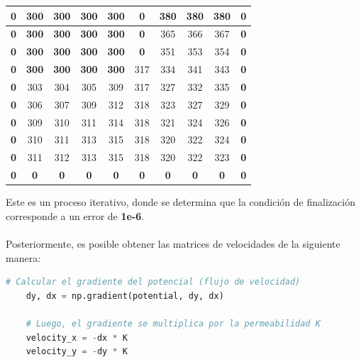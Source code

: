 \begin{center}
    \begin{tabular}{|c|c|c|c|c|c|c|c|c|c|} 
        \hline
        \textbf{0} & \textbf{300} & \textbf{300} & \textbf{300} & \textbf{300} & \textbf{0} & \textbf{380} & \textbf{380} & \textbf{380} & \textbf{0} \\
        \hline
        \textbf{0} & \textbf{300} & \textbf{300} & \textbf{300} & \textbf{300} & \textbf{0} & 365 & 366 & 367 & \textbf{0} \\
        \hline
        \textbf{0} & \textbf{300} & \textbf{300} & \textbf{300} & \textbf{300} & \textbf{0} & 351 & 353 & 354 & \textbf{0} \\
        \hline
        \textbf{0} & \textbf{300} & \textbf{300} & \textbf{300} & \textbf{300} & 317 & 334 & 341 & 343 & \textbf{0} \\
        \hline
        \textbf{0} & 303 & 304 & 305 & 309 & 317 & 327 & 332 & 335 & \textbf{0} \\
        \hline
        \textbf{0} & 306 & 307 & 309 & 312 & 318 & 323 & 327 & 329 & \textbf{0} \\
        \hline
        \textbf{0} & 309 & 310 & 311 & 314 & 318 & 321 & 324 & 326 & \textbf{0} \\
        \hline
        \textbf{0} & 310 & 311 & 313 & 315 & 318 & 320 & 322 & 324 & \textbf{0} \\
        \hline
        \textbf{0} & 311 & 312 & 313 & 315 & 318 & 320 & 322 & 323 & \textbf{0} \\
        \hline
        \textbf{0} & \textbf{0} & \textbf{0} & \textbf{0} & \textbf{0} & \textbf{0} & \textbf{0} & \textbf{0} & \textbf{0} & \textbf{0} \\
        \hline
    \end{tabular}         
\end{center}

Este es un proceso iterativo, donde se determina que la condición de finalización corresponde a un error de \textbf{1e-6}.
\\ \\
Posteriormente, es posible obtener las matrices de velocidades de la siguiente manera:

\begin{lstlisting}[language=Python]
    # Calcular el gradiente del potencial (flujo de velocidad)
    dy, dx = np.gradient(potential, dy, dx)

    # Luego, el gradiente se multiplica por la permeabilidad K
    velocity_x = -dx * K 
    velocity_y = -dy * K
\end{lstlisting}

